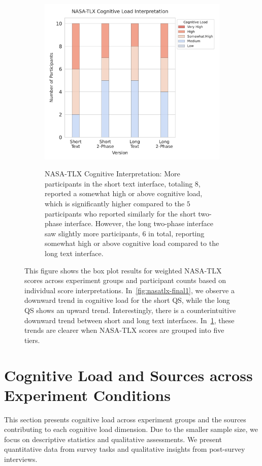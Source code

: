 \begin{figure}[htbp]
{\begin{subfigure}{0.49\textwidth}
{                \includegraphics[width=1.05\textwidth]{content/image/results/nasatlx_cog_value_interpreted.pdf}
            }
            \caption{NASA-TLX Cognitive Interpretation: More participants in the short text interface, totaling $8$, reported a somewhat high or above cognitive load, which is significantly higher compared to the $5$ participants who reported similarly for the short two-phase interface. However, the long two-phase interface saw slightly more participants, $6$ in total, reporting somewhat high or above cognitive load compared to the long text interface.}
            \label{fig:nasatlx-final2}
        \end{subfigure}
    }
    \caption{This figure shows the box plot results for weighted NASA-TLX scores across experiment groups and participant counts based on individual score interpretations. In~\ref{fig:nasatlx-final1}, we observe a downward trend in cognitive load for the short QS, while the long QS shows an upward trend. Interestingly, there is a counterintuitive downward trend between short and long text interfaces. In~\ref{fig:nasatlx-final2}, these trends are clearer when NASA-TLX scores are grouped into five tiers.}
    \label{fig:nasatlx-final}
\end{figure}


\section{Cognitive Load and Sources across Experiment Conditions}
\label{sec:cog_result}
This section presents cognitive load across experiment groups and the sources contributing to each cognitive load dimension. Due to the smaller sample size, we focus on descriptive statistics and qualitative assessments. We present quantitative data from survey tasks and qualitative insights from post-survey interviews.

